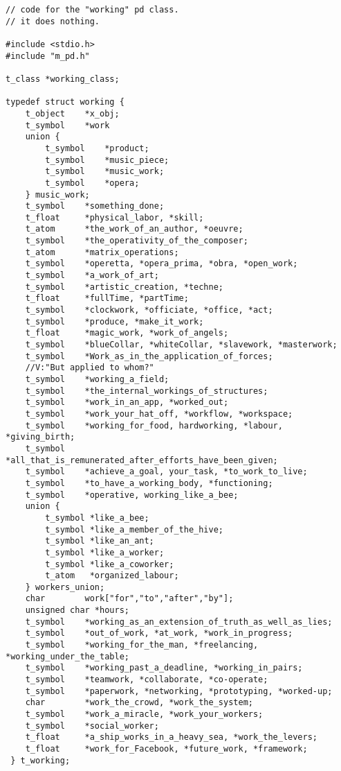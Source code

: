 \begin{flushleft}
\small
\begin{lstlisting}
// code for the "working" pd class. 
// it does nothing.

#include <stdio.h>
#include "m_pd.h"

t_class *working_class;

typedef struct working {
	t_object 	*x_obj;
	t_symbol	*work
	union {
		t_symbol    *product;
		t_symbol 	*music_piece;
		t_symbol 	*music_work;
		t_symbol 	*opera;
	} music_work;
	t_symbol 	*something_done;
	t_float		*physical_labor, *skill;
	t_atom		*the_work_of_an_author, *oeuvre;
	t_symbol	*the_operativity_of_the_composer;
	t_atom		*matrix_operations;
	t_symbol	*operetta, *opera_prima, *obra, *open_work;
	t_symbol	*a_work_of_art;
	t_symbol	*artistic_creation, *techne;
	t_float		*fullTime, *partTime;
	t_symbol	*clockwork, *officiate, *office, *act;
	t_symbol	*produce, *make_it_work;
	t_float		*magic_work, *work_of_angels;
	t_symbol	*blueCollar, *whiteCollar, *slavework, *masterwork;
	t_symbol	*Work_as_in_the_application_of_forces;
	//V:"But applied to whom?"
	t_symbol	*working_a_field;
	t_symbol	*the_internal_workings_of_structures;
	t_symbol	*work_in_an_app, *worked_out;
	t_symbol	*work_your_hat_off, *workflow, *workspace;
	t_symbol	*working_for_food, hardworking, *labour, *giving_birth;
	t_symbol	*all_that_is_remunerated_after_efforts_have_been_given;
	t_symbol	*achieve_a_goal, your_task, *to_work_to_live;
	t_symbol	*to_have_a_working_body, *functioning;
	t_symbol	*operative, working_like_a_bee;
	union {
		t_symbol *like_a_bee;
		t_symbol *like_a_member_of_the_hive;
		t_symbol *like_an_ant;
		t_symbol *like_a_worker;
		t_symbol *like_a_coworker;
		t_atom	 *organized_labour;
	} workers_union;
	char 		work["for","to","after","by"];
	unsigned char *hours;
	t_symbol	*working_as_an_extension_of_truth_as_well_as_lies;
	t_symbol	*out_of_work, *at_work, *work_in_progress;
	t_symbol	*working_for_the_man, *freelancing, *working_under_the_table;
	t_symbol	*working_past_a_deadline, *working_in_pairs;
	t_symbol	*teamwork, *collaborate, *co-operate;
	t_symbol	*paperwork, *networking, *prototyping, *worked-up;
	char		*work_the_crowd, *work_the_system;
	t_symbol	*work_a_miracle, *work_your_workers;
	t_symbol	*social_worker;
	t_float		*a_ship_works_in_a_heavy_sea, *work_the_levers;
	t_float		*work_for_Facebook, *future_work, *framework;
 } t_working;
\end{lstlisting}
\end{flushleft}
